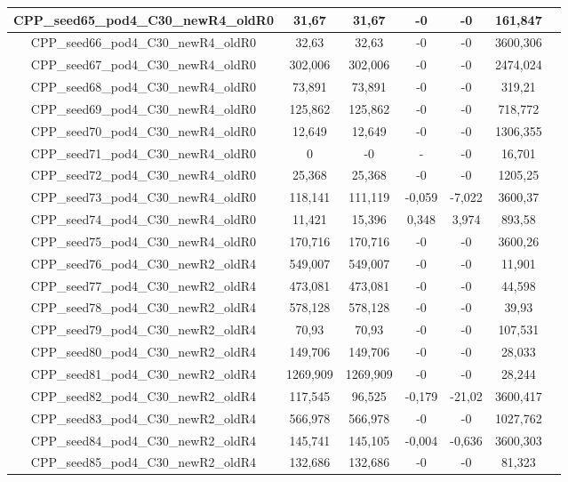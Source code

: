 \documentclass[a4paper]{article}
\begin{document}
\begin{center}
\begin{longtable}{ccccccc}
\hline
CPP\_seed65\_pod4\_C30\_newR4\_oldR0 & 31,67 & 31,67 & -0 & -0 & 161,847\\
\hline
CPP\_seed66\_pod4\_C30\_newR4\_oldR0 & 32,63 & 32,63 & -0 & -0 & 3600,306\\
\hline
CPP\_seed67\_pod4\_C30\_newR4\_oldR0 & 302,006 & 302,006 & -0 & -0 & 2474,024\\
\hline
CPP\_seed68\_pod4\_C30\_newR4\_oldR0 & 73,891 & 73,891 & -0 & -0 & 319,21\\
\hline
CPP\_seed69\_pod4\_C30\_newR4\_oldR0 & 125,862 & 125,862 & -0 & -0 & 718,772\\
\hline
CPP\_seed70\_pod4\_C30\_newR4\_oldR0 & 12,649 & 12,649 & -0 & -0 & 1306,355\\
\hline
CPP\_seed71\_pod4\_C30\_newR4\_oldR0 & 0 & -0 & - & -0 & 16,701\\
\hline
CPP\_seed72\_pod4\_C30\_newR4\_oldR0 & 25,368 & 25,368 & -0 & -0 & 1205,25\\
\hline
CPP\_seed73\_pod4\_C30\_newR4\_oldR0 & 118,141 & 111,119 & -0,059 & -7,022 & 3600,37\\
\hline
CPP\_seed74\_pod4\_C30\_newR4\_oldR0 & 11,421 & 15,396 & 0,348 & 3,974 & 893,58\\
\hline
CPP\_seed75\_pod4\_C30\_newR4\_oldR0 & 170,716 & 170,716 & -0 & -0 & 3600,26\\
\hline
CPP\_seed76\_pod4\_C30\_newR2\_oldR4 & 549,007 & 549,007 & -0 & -0 & 11,901\\
\hline
CPP\_seed77\_pod4\_C30\_newR2\_oldR4 & 473,081 & 473,081 & -0 & -0 & 44,598\\
\hline
CPP\_seed78\_pod4\_C30\_newR2\_oldR4 & 578,128 & 578,128 & -0 & -0 & 39,93\\
\hline
CPP\_seed79\_pod4\_C30\_newR2\_oldR4 & 70,93 & 70,93 & -0 & -0 & 107,531\\
\hline
CPP\_seed80\_pod4\_C30\_newR2\_oldR4 & 149,706 & 149,706 & -0 & -0 & 28,033\\
\hline
CPP\_seed81\_pod4\_C30\_newR2\_oldR4 & 1269,909 & 1269,909 & -0 & -0 & 28,244\\
\hline
CPP\_seed82\_pod4\_C30\_newR2\_oldR4 & 117,545 & 96,525 & -0,179 & -21,02 & 3600,417\\
\hline
CPP\_seed83\_pod4\_C30\_newR2\_oldR4 & 566,978 & 566,978 & -0 & -0 & 1027,762\\
\hline
CPP\_seed84\_pod4\_C30\_newR2\_oldR4 & 145,741 & 145,105 & -0,004 & -0,636 & 3600,303\\
\hline
CPP\_seed85\_pod4\_C30\_newR2\_oldR4 & 132,686 & 132,686 & -0 & -0 & 81,323\\

\end{longtable}
\end{center}
\end{document}
